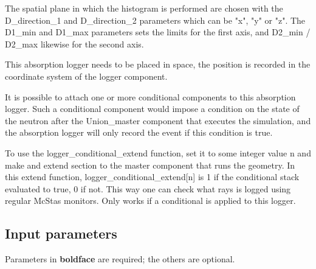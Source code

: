 The spatial plane in which the histogram is performed are chosen with the D\_direction\_1 and D\_direction\_2 parameters which can be "x", "y" or "z". The D1\_min and D1\_max parameters sets the limits for the first axis, and D2\_min / D2\_max likewise for the second axis.

This absorption logger needs to be placed in space, the position is recorded in the coordinate system of the logger component.

It is possible to attach one or more conditional components to this absorption logger. Such a conditional component would impose a condition on the state of the neutron after the Union\_master component that executes the simulation, and the absorption logger will only record the event if this condition is true.

To use the logger\_conditional\_extend function, set it to some integer value n and make and extend section to the master component that runs the geometry. In this extend function, logger\_conditional\_extend[n] is 1 if the conditional stack evaluated to true, 0 if not. This way one can check what rays is logged using regular McStas monitors. Only works if a conditional is applied to this logger.

\subsection*{Input parameters}
Parameters in \textbf{boldface} are required; the others are optional.

